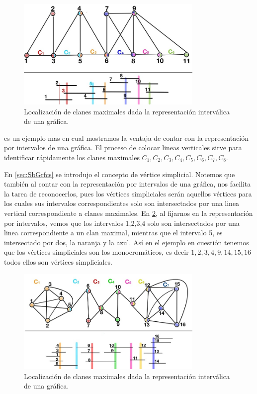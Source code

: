 \begin{figure}[H]
  \centering
  \includegraphics[width=0.8\textwidth]{recursos/capturas/208.jpg}
  \caption{Localización de clanes maximales dada la representación interválica de una gráfica.}
  \label{fig:208}
\end{figure}

 es un ejemplo mas en cual mostramos la ventaja de contar con la representación por intervalos de una gráfica. El proceso de colocar lineas verticales sirve para identificar rápidamente los clanes maximales $C_1,C_2, C_3, C_4, C_5, C_6, C_7, C_8$.

En \cref{sec:SbGrfcs} se introdujo el concepto de vértice simplicial. Notemos que también al contar con la representación por intervalos de una gráfica, nos facilita la tarea de reconocerlos, pues los vértices simpliciales serán aquellos vértices para los cuales sus intervalos  correspondientes solo son intersectados por una linea vertical correspondiente a clanes maximales. En \cref{fig:209}, al fijarnos en la representación por intervalos, vemos que los intervalos 1,2,3,4 solo son intersectados por una linea correspondiente a un clan maximal, mientras que el intervalo 5, es intersectado por dos, la naranja y la azul. Así en el ejemplo en cuestión tenemos que los vértices simpliciales son los monocrom\'aticos, es decir $1,2,3,4,9,14,15,16$ todos ellos son vértices simpliciales.

\begin{figure}[H]
  \centering
  \includegraphics[width=0.8\textwidth]{recursos/capturas/209.jpg}
  \caption{Localización de clanes maximales dada la representación interválica de una gráfica.}
  \label{fig:209}
\end{figure}

